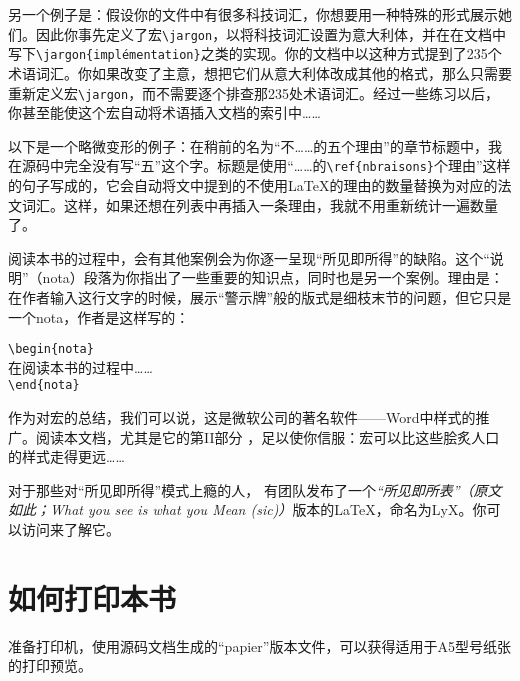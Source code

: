 另一个例子是：假设你的文件中有很多科技词汇，你想要用一种特殊的形式展示她们。\linebreak 因此你事先定义了宏\texttt{\backslash jargon}，以将科技词汇设置为意大利体，并在在文档中写下\linebreak \texttt{\backslash jargon\{implémentation\}}之类的实现。你的文档中以这种方式提到了235个术语词汇。你如果改变了主意，想把它们从意大利体改成其他的格式，那么只需要重新定义宏\texttt{\backslash jargon}，而不需要逐个排查那235处术语词汇。经过一些练习以后，你甚至能使这个宏自动将术语插入文档的索引中……

以下是一个略微变形的例子：在稍前的名为“不……的五个理由”的章节标题中，我在源码中完全没有写“五”这个字。标题是使用“……的\texttt{\backslash ref\{nbraisons\}}个理由”这样的句子写成的，它会自动将文中提到的不使用\LaTeX 的理由的数量替换为对应的法文词汇。这样，如果还想在列表中再插入一条理由，我就不用重新统计一遍数量了。

\begin{exclamation}
    阅读本书的过程中，会有其他案例会为你逐一呈现“所见即所得”的缺陷。这个“说明”（nota）段落为你指出了一些重要的知识点，同时也是另一个案例。理由是：在作者输入这行文字的时候，展示“警示牌”般的版式是细枝末节的问题，但它只是一个nota，作者是这样写的：

    \begin{dmd}
\verb+\begin{nota}+\\
  在阅读本书的过程中……\\
\verb+\end{nota}+
    \end{dmd}
\end{exclamation}

作为对宏的总结，我们可以说，这是微软公司的著名软件——Word中样式的推广。阅读本文档，尤其是它的第II部分%
，足以使你信服：宏可以比这些脍炙人口的样式走得更远……

对于那些对“所见即所得”模式上瘾的人， 有团队发布了一个\emph{“所见即所表”（原文如此；What you see is what you Mean (sic)）}版本的\LaTeX ，命名为LyX。你可以访问来了解它。

\section*{如何打印本书}

准备打印机，使用源码文档生成的“papier”版本文件，可以获得适用于A5型号纸张的打印预览。

